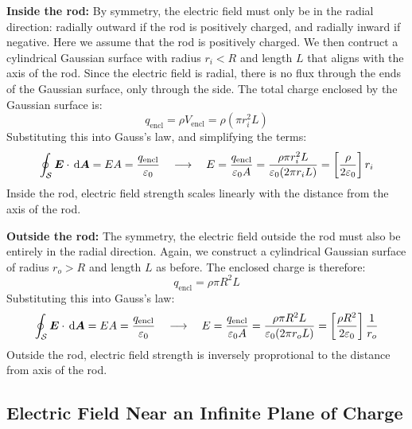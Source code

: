 \textbf{Inside the rod:} By symmetry, the electric field must only be in the
radial direction: radially outward if the rod is positively charged, and
radially inward if negative. Here we assume that the rod is positively charged.
We then contruct a cylindrical Gaussian surface with radius $r_i<R$ and length
$L$ that aligns with the axis of the rod. Since the electric field is radial,
there is no flux through the ends of the Gaussian surface, only through the
side. The total charge enclosed by the Gaussian surface is:
\begin{equation*}
  q_\text{encl}=\rho V_\text{encl}=\rho(\pi r_i^2L)
\end{equation*}
Substituting this into Gauss's law, and simplifying the terms:
\begin{equation*}
  \oint_{\mathcal S}\bm E\cdot\dl{\bm A}=EA=\frac{q_\text{encl}}{\varepsilon_0}
  \quad\longrightarrow\quad
  E=\frac{q_\text{encl}}{\varepsilon_0A}
  =\frac{\rho\pi r_i^2L}{\varepsilon_0(2\pi r_iL)}
  =\left[\frac\rho{2\varepsilon_0}\right]r_i
\end{equation*}
Inside the rod, electric field strength scales linearly with the distance from
the axis of the rod.

\textbf{Outside the rod:} The symmetry, the electric field outside the rod
must also be entirely in the radial direction. Again, we construct a
cylindrical Gaussian surface of radius $r_o>R$ and length $L$ as before. The
enclosed charge is therefore:
\begin{equation*}
  q_\text{encl}=\rho\pi R^2L
\end{equation*}
Substituting this into Gauss's law:
\begin{equation*}
  \oint_{\mathcal S}\bm E\cdot\dl{\bm A}=EA=\frac{q_\text{encl}}{\varepsilon_0}
  \quad\longrightarrow\quad
  E=\frac{q_\text{encl}}{\varepsilon_0A}
  =\frac{\rho\pi R^2L}{\varepsilon_0(2\pi r_oL)}
  =\left[\frac{\rho R^2}{2\varepsilon_0}\right]\frac1{r_o}
\end{equation*}
Outside the rod, electric field strength is inversely proprotional to the
distance from axis of the rod.



\subsection{Electric Field Near an Infinite Plane of Charge}
\begin{figure}[ht]
  \centering
\end{figure}

